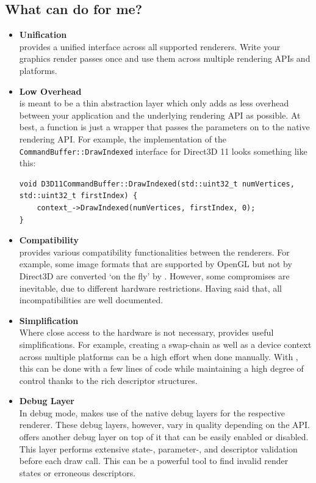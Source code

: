 \documentclass{article}
\begin{document}
\subsection{What can \LLGL do for me?}

\begin{itemize}
	\item \textbf{Unification} \\
	\LLGL provides a unified interface across all supported renderers.
	Write your graphics render passes once and use them across multiple rendering APIs and platforms.

	\item \textbf{Low Overhead} \\
	\LLGL is meant to be a thin abstraction layer which only adds as less overhead between your application and the underlying rendering API as possible.
	At best, a function is just a wrapper that passes the parameters on to the native rendering API.
	For example, the implementation of the \texttt{CommandBuffer::DrawIndexed} interface for Direct3D 11 looks something like this:
\begin{lstlisting}
void D3D11CommandBuffer::DrawIndexed(std::uint32_t numVertices, std::uint32_t firstIndex) {
    context_->DrawIndexed(numVertices, firstIndex, 0);
}
\end{lstlisting}

	\item \textbf{Compatibility} \\
	\LLGL provides various compatibility functionalities between the renderers.
	For example, some image formats that are supported by OpenGL but not by Direct3D are converted `on the fly' by \LLGL.
	However, some compromises are inevitable, due to different hardware restrictions.
	Having said that, all incompatibilities are well documented.

	\item \textbf{Simplification} \\
	Where close access to the hardware is not necessary, \LLGL provides useful simplifications.
	For example, creating a swap-chain as well as a device context across multiple platforms can be a high effort when done manually.
	With \LLGL, this can be done with a few lines of code while maintaining a high degree of control thanks to the rich descriptor structures.

	\item \textbf{Debug Layer} \\
	In debug mode, \LLGL makes use of the native debug layers for the respective renderer.
	These debug layers, however, vary in quality depending on the API.
	\LLGL offers another debug layer on top of it that can be easily enabled or disabled.
	This layer performs extensive state-, parameter-, and descriptor validation before each draw call.
	This can be a powerful tool to find invalid render states or erroneous descriptors.


\end{itemize}
\end{document}
